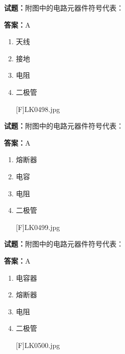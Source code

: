 \documentclass{ctexbook}
\begin{document}




\vspace{1em}

\textbf{试题：}附图中的电路元器件符号代表： 

\textbf{答案：}A 

\begin{enumerate}[leftmargin=3em]
  \item 天线 

  \item 接地 

  \item 电阻 

  \item 二极管 

[F]LK0498.jpg 

\end{enumerate}





\vspace{1em}

\textbf{试题：}附图中的电路元器件符号代表： 

\textbf{答案：}A 

\begin{enumerate}[leftmargin=3em]
  \item 熔断器 

  \item 电容 

  \item 电阻 

  \item 二极管 

[F]LK0499.jpg 

\end{enumerate}





\vspace{1em}

\textbf{试题：}附图中的电路元器件符号代表： 

\textbf{答案：}A 

\begin{enumerate}[leftmargin=3em]
  \item 电容器 

  \item 熔断器 

  \item 电阻 

  \item 二极管 

[F]LK0500.jpg 

\end{enumerate}
\end{document}
